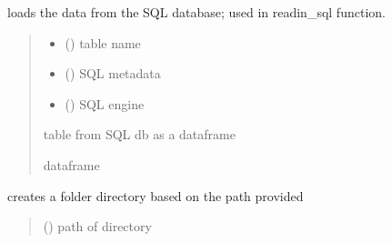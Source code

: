 \documentclass[letterpaper,10pt,english]{sphinxmanual}
\begin{document}
\begin{fulllineitems}
\label{\detokenize{src.models.electricity.scripts.preprocessor:src.models.electricity.scripts.preprocessor.load_data}}
\pysigstartsignatures
\pysiglinewithargsret
{}
{\sphinxparamcomma {}\sphinxparamcomma {}}
{}
\pysigstopsignatures
\sphinxAtStartPar
loads the data from the SQL database; used in readin\_sql function.
\begin{quote}\begin{description}
\begin{itemize}
\item {} 
\sphinxAtStartPar
{} () \textendash{} table name

\item {} 
\sphinxAtStartPar
{} () \textendash{} SQL metadata

\item {} 
\sphinxAtStartPar
{} () \textendash{} SQL engine

\end{itemize}

\sphinxAtStartPar
table from SQL db as a dataframe

\sphinxAtStartPar
dataframe

\end{description}\end{quote}

\end{fulllineitems}


\begin{fulllineitems}
\label{\detokenize{src.models.electricity.scripts.preprocessor:src.models.electricity.scripts.preprocessor.makedir}}
\pysigstartsignatures
\pysiglinewithargsret
{}
{}
{}
\pysigstopsignatures
\sphinxAtStartPar
creates a folder directory based on the path provided
\begin{quote}\begin{description}
\sphinxAtStartPar
{} () \textendash{} path of directory

\end{description}\end{quote}

\end{fulllineitems}
\end{document}
